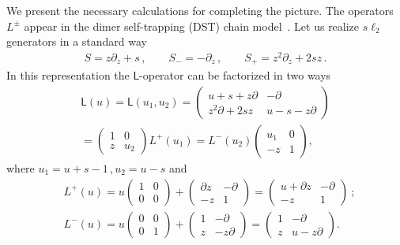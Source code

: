 \documentclass[11pt]{article}
\numberwithin{equation}{section}
\theoremstyle{plain}
\theoremstyle{definition}
\def\dd{\partial}
\begin{document}
We present the necessary  calculations for completing  the picture. 
The operators $L^{\pm}$ appear in the dimer self-trapping (DST)
chain model~\cite{KSS,Skl2}. 
Let us realize $s\ell_2$ generators in a standard way 
\begin{align}
	\label{generators}
	S = z\partial_z + s \,, \qquad S_- = -\partial_z \,, \qquad 
	S_+ = z^2\partial_z+2sz \,.
\end{align}
In this representation the $\mathsf{L}$-operator can be factorized in two ways
\begin{multline}
	\mathsf{L}(u) = \mathsf{L}(u_1,u_2) = 
	\left(\begin{array}{cc} u+s+z \partial & -\partial\\
		z^2 \partial + 2s z & u-s -z\partial
	\end{array}\right) \\ 
	= \left(\begin{array}{cc}
		1 & 0 \\
		z& u_2\end{array}\right)L^{+}(u_1) =
	L^{-}(u_2)\left(\begin{array}{cc}
		u_1 & 0 \\
		-z& 1\end{array}\right)
	\label{Lfactor'},
\end{multline}
where $u_1 = u+s-1 \,, u_2=u-s$ and 
\begin{align}\label{Lp}
	&L^+(u) = u \left(\begin{array}{cc}
		1 & 0 \\
		0 & 0\end{array}\right) + \left(\begin{array}{cc}
		\dd z & -\dd \\
		-z& 1\end{array}\right) = \left(\begin{array}{cc}
		u + \dd z & -\dd \\
		-z& 1\end{array}\right) \ ; 
	\\ \label{Lm}
	&L^-(u) = u \left(\begin{array}{cc}
		0 & 0 \\
		0 & 1\end{array}\right) + \left(\begin{array}{cc}
		1 & -\dd \\
		z& -z\dd\end{array}\right) =  \left(\begin{array}{cc}
		1 & -\dd \\
		z& u-z\dd\end{array}\right).
\end{align}
\end{document}
